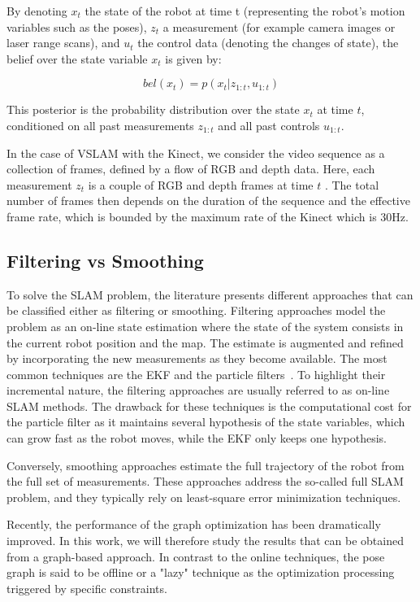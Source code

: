 By denoting $x_t$ the state of the robot at time t (representing the robot's motion variables such as the poses), $z_t$ a measurement (for example camera images or laser range scans), and $u_t$ the control data (denoting the changes of state), the belief over the state variable $x_t$ is given by:

\[bel(x_t) = p(x_t | z_{1:t}, u_{1:t})\]

This posterior is the probability distribution over the state $x_t$ at time $t$, conditioned on all past measurements $z_{1:t}$ and all past controls $u_{1:t}$.

In the case of \gls{VSLAM} with the Kinect, we consider the video sequence as a collection of frames, defined by a flow of RGB and depth data. Here, each measurement $z_t$ is a couple of RGB and depth frames at time $t$ . The total number of frames then depends on the duration of the sequence and the effective frame rate, which is bounded by the maximum rate of the Kinect which is 30Hz.


\subsection{Filtering vs Smoothing}

To solve the \gls{SLAM} problem, the literature presents different approaches that can be classified either as filtering or smoothing. Filtering approaches model the problem as an on-line state estimation where the state of the system consists in the current robot position and the map. The estimate is augmented and refined by incorporating the new measurements as they become available.
The most common techniques are the \gls{EKF} and the particle filters~\cite{Thrun_2005}. To highlight their incremental nature, the filtering approaches are usually referred to as on-line \gls{SLAM} methods. The drawback for these techniques is the computational cost for the particle filter as it maintains several hypothesis of the state variables, which can grow fast as the robot moves, while the \gls{EKF} only keeps one hypothesis.

Conversely, smoothing approaches estimate the full trajectory of the robot from the full set of measurements. These approaches address the so-called full \gls{SLAM} problem, and they typically rely on least-square error minimization techniques.

Recently, the performance of the graph optimization has been dramatically improved. In this work, we will therefore study the results that can be obtained from a graph-based approach. In contrast to the online techniques, the pose graph is said to be offline or a "lazy" technique as the optimization processing triggered by specific constraints.

